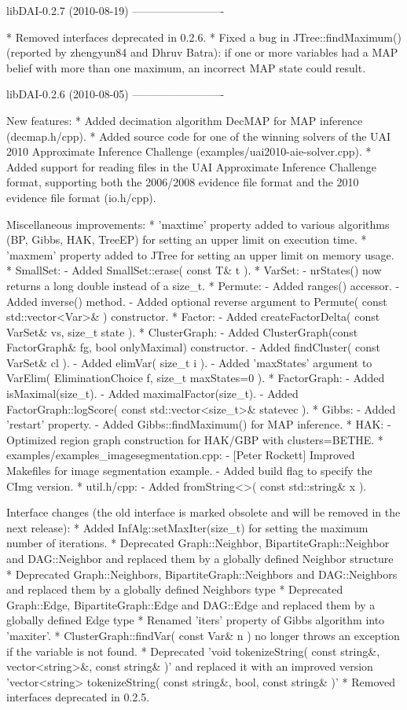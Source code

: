 \begin{DoxyVerbInclude}
libDAI-0.2.7 (2010-08-19)
-------------------------

* Removed interfaces deprecated in 0.2.6.
* Fixed a bug in JTree::findMaximum() (reported by zhengyun84 and Dhruv Batra):
  if one or more variables had a MAP belief with more than one maximum, an 
  incorrect MAP state could result.


libDAI-0.2.6 (2010-08-05)
-------------------------

New features:
* Added decimation algorithm DecMAP for MAP inference (decmap.h/cpp).
* Added source code for one of the winning solvers of the 
  UAI 2010 Approximate Inference Challenge (examples/uai2010-aie-solver.cpp).
* Added support for reading files in the UAI Approximate Inference Challenge
  format, supporting both the 2006/2008 evidence file format and the 2010
  evidence file format (io.h/cpp).

Miscellaneous improvements:
* 'maxtime' property added to various algorithms (BP, Gibbs, HAK, TreeEP)
  for setting an upper limit on execution time.
* 'maxmem' property added to JTree for setting an upper limit on memory usage.
* SmallSet:
  - Added SmallSet::erase( const T& t ).
* VarSet:
  - nrStates() now returns a long double instead of a size_t.
* Permute:
  - Added ranges() accessor.
  - Added inverse() method.
  - Added optional reverse argument to Permute( const std::vector<Var>& ) constructor.
* Factor:
  - Added createFactorDelta( const VarSet& vs, size_t state ).
* ClusterGraph:
  - Added ClusterGraph(const FactorGraph& fg, bool onlyMaximal) constructor.
  - Added findCluster( const VarSet& cl ).
  - Added elimVar( size_t i ).
  - Added 'maxStates' argument to VarElim( EliminationChoice f, size_t maxStates=0 ).
* FactorGraph:
  - Added isMaximal(size_t).
  - Added maximalFactor(size_t).
  - Added FactorGraph::logScore( const std::vector<size_t>& statevec ).
* Gibbs:
  - Added 'restart' property.
  - Added Gibbs::findMaximum() for MAP inference.
* HAK:
  - Optimized region graph construction for HAK/GBP with clusters=BETHE.
* examples/examples_imagesegmentation.cpp:
  - [Peter Rockett] Improved Makefiles for image segmentation example.
  - Added build flag to specify the CImg version.
* util.h/cpp:
  - Added fromString<>( const std::string& x ).

Interface changes (the old interface is marked obsolete and will be removed in the next release):
* Added InfAlg::setMaxIter(size_t) for setting the maximum number of iterations.
* Deprecated Graph::Neighbor, BipartiteGraph::Neighbor and DAG::Neighbor
  and replaced them by a globally defined Neighbor structure
* Deprecated Graph::Neighbors, BipartiteGraph::Neighbors and DAG::Neighbors
  and replaced them by a globally defined Neighbors type
* Deprecated Graph::Edge, BipartiteGraph::Edge and DAG::Edge
  and replaced them by a globally defined Edge type
* Renamed 'iters' property of Gibbs algorithm into 'maxiter'.
* ClusterGraph::findVar( const Var& n ) no longer throws an exception if the
  variable is not found.
* Deprecated 'void tokenizeString( const string&, vector<string>&, const string& )'
  and replaced it with an improved version
  'vector<string> tokenizeString( const string&, bool, const string& )'
* Removed interfaces deprecated in 0.2.5.


\end{DoxyVerbInclude}

